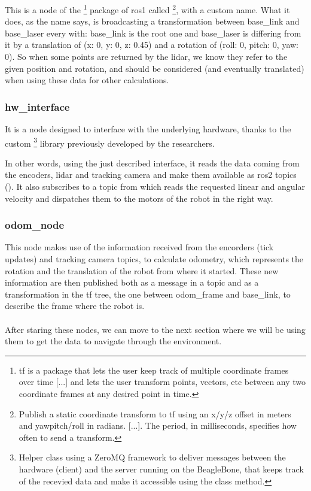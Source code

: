 This is a node of the \footnote{tf is a package that lets the user keep track of multiple coordinate frames over time [...] and lets the user transform points, vectors, etc between any two coordinate frames at any desired point in time.\cite{tf}} package of \Acrshort{ros}1 called \footnote{Publish a static coordinate transform to tf using an x/y/z offset in meters and yaw\/pitch/roll in radians. [...]. The period, in milliseconds, specifies how often to send a transform.}, with a custom name. What it does, as the name says, is broadcasting a transformation between base\_link and base\_laser every  with: base\_link is the root one and base\_laser is differing from it by a translation of (x: 0, y: 0, z: 0.45) and a rotation of (roll: 0, pitch: 0, yaw: 0). So when some points are returned by the lidar, we know they refer to the given position and rotation, and should be considered (and eventually translated) when using these data for other calculations.

\subsubsection{hw\_interface}

It is a node designed to interface with the underlying hardware, thanks to the custom \footnote{Helper class using a ZeroMQ framework to deliver messages between the hardware (client) and the server running on the BeagleBone, that keeps track of the recevied data and make it accessible using the class method.} library previously developed by the researchers.

In other words, using the just described interface, it reads the data coming from the encoders, lidar and tracking camera and make them available as \Acrshort{ros}2 topics (). It also subscribes to a  topic from which reads the requested linear and angular velocity and dispatches them to the motors of the robot in the right way.

\subsubsection{odom\_node}

This node makes use of the information received from the encorders (tick updates) and tracking camera topics, to calculate odometry, which represents the rotation and the translation of the robot from where it started. These new information are then published both as a message in a topic and as a transformation in the tf tree, the one between odom\_frame and base\_link, to describe the frame where the robot is. \\\\

After staring these nodes, we can move to the next section where we will be using them to get the data to navigate through the environment.